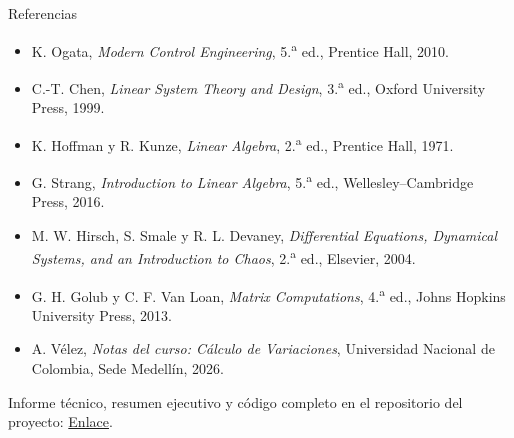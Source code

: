 \documentclass[aspectratio=169,11pt]{beamer}
\newcommand{\franjapaleta}[1]{%
  \foreach [count=\i from 0] \c in {marino!60!white,petroleo,grisverde,salvia,limon}{%
    \fill[\c] ([xshift=\i*0.2*\paperwidth,yshift=#1]current page.south west)
      rectangle ([xshift={(\i+1)*0.2*\paperwidth},yshift={#1+0.3cm}]current page.south west);}%
}
\begin{document}
\begin{frame}{Referencias}
  \small
  \begin{itemize}
    \item K. Ogata, \emph{Modern Control Engineering}, 5.\textsuperscript{a} ed., Prentice Hall, 2010.
    \item C.-T. Chen, \emph{Linear System Theory and Design}, 3.\textsuperscript{a} ed., Oxford University Press, 1999.
    \item K. Hoffman y R. Kunze, \emph{Linear Algebra}, 2.\textsuperscript{a} ed., Prentice Hall, 1971.
    \item G. Strang, \emph{Introduction to Linear Algebra}, 5.\textsuperscript{a} ed., Wellesley--Cambridge Press, 2016.
    \item M. W. Hirsch, S. Smale y R. L. Devaney, \emph{Differential Equations, Dynamical Systems, and an Introduction to Chaos}, 2.\textsuperscript{a} ed., Elsevier, 2004.
    \item G. H. Golub y C. F. Van Loan, \emph{Matrix Computations}, 4.\textsuperscript{a} ed., Johns Hopkins University Press, 2013.
    \item A. V\'elez, \emph{Notas del curso: C\'alculo de Variaciones}, Universidad Nacional de Colombia, Sede Medell\'in, 2026.
  \end{itemize}
  \vspace{0.4em}
  \footnotesize Informe t\'ecnico, resumen ejecutivo y c\'odigo completo en el
  repositorio del proyecto:
  \href{https://github.com/sauribee/proyecto-pendulos.git}{\textcolor{petroleo}{Enlace}}.
\end{frame}

\begin{frame}[plain]
\end{frame}
\end{document}
